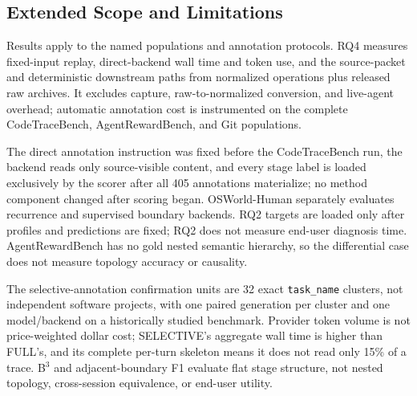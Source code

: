\documentclass[letterpaper]{article}
\begin{document}
\subsection{Extended Scope and Limitations}
\label{app:scope}

Results apply to the named populations and annotation protocols.
RQ4 measures fixed-input replay, direct-backend wall time and token use, and
the source-packet and deterministic downstream paths from normalized
operations plus released raw archives. It excludes capture, raw-to-normalized
conversion, and live-agent overhead; automatic annotation cost is instrumented
on the complete CodeTraceBench, AgentRewardBench, and Git populations.

The direct annotation instruction was fixed before the CodeTraceBench run,
the backend reads only source-visible content, and every stage label is
loaded exclusively by the scorer after all 405 annotations materialize; no
method component changed after scoring began. OSWorld-Human separately
evaluates recurrence and supervised boundary backends. RQ2 targets are
loaded only after profiles and predictions are fixed; RQ2 does not measure
end-user diagnosis time. AgentRewardBench has no gold nested semantic
hierarchy, so the differential case does not measure topology accuracy or
causality.

The selective-annotation confirmation units are 32 exact
\texttt{task\_name} clusters,
not independent software projects, with one paired generation per cluster and
one model/backend on a historically studied benchmark. Provider token volume
is not price-weighted dollar cost; SELECTIVE's aggregate wall time is higher
than FULL's, and its complete per-turn skeleton means it does not read only
15\% of a trace. B$^3$ and adjacent-boundary F1 evaluate flat stage structure,
not nested topology, cross-session equivalence, or end-user utility.
\end{document}
